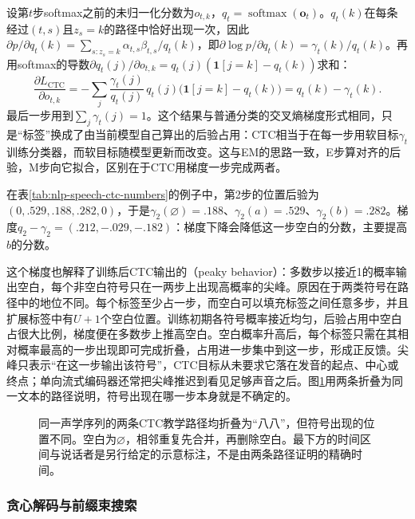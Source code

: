 设第$t$步softmax之前的未归一化分数为$o_{t,k}$，$q_t=\operatorname{softmax}(\bm{o}_t)$。$q_t(k)$在每条经过$(t,s)$且$z_s=k$的路径中恰好出现一次，因此$\partial p/\partial q_t(k)=\sum_{s:z_s=k}\alpha_{t,s}\beta_{t,s}/q_t(k)$，即$\partial\log p/\partial q_t(k)=\gamma_t(k)/q_t(k)$。再用softmax的导数$\partial q_t(j)/\partial o_{t,k}=q_t(j)(\mathbf{1}[j=k]-q_t(k))$求和：
\begin{equation}
 \frac{\partial L_{\mathrm{CTC}}}{\partial o_{t,k}}
 =-\sum_j\frac{\gamma_t(j)}{q_t(j)}\,q_t(j)\bigl(\mathbf{1}[j=k]-q_t(k)\bigr)
 =q_t(k)-\gamma_t(k).
 \label{eq:nlp-speech-ctc-gradient}
\end{equation}
最后一步用到$\sum_j\gamma_t(j)=1$。这个结果与普通分类的交叉熵梯度形式相同，只是“标签”换成了由当前模型自己算出的后验占用：CTC相当于在每一步用软目标$\gamma_t$训练分类器，而软目标随模型更新而改变。这与EM的思路一致，E步算对齐的后验，M步向它拟合，区别在于CTC用梯度一步完成两者。

在表\ref{tab:nlp-speech-ctc-numbers}的例子中，第2步的位置后验为$(0,.529,.188,.282,0)$，于是$\gamma_2(\varnothing)=.188$、$\gamma_2(a)=.529$、$\gamma_2(b)=.282$。梯度$q_2-\gamma_2=(.212,-.029,-.182)$：梯度下降会降低这一步空白的分数，主要提高$b$的分数。

这个梯度也解释了训练后CTC输出的（peaky behavior）：多数步以接近1的概率输出空白，每个非空白符号只在一两步上出现高概率的尖峰。原因在于两类符号在路径中的地位不同。每个标签至少占一步，而空白可以填充标签之间任意多步，并且扩展标签中有$U+1$个空白位置。训练初期各符号概率接近均匀，后验占用中空白占很大比例，梯度便在多数步上推高空白。空白概率升高后，每个标签只需在其相对概率最高的一步出现即可完成折叠，占用进一步集中到这一步，形成正反馈。尖峰只表示“在这一步输出该符号”，CTC目标从未要求它落在发音的起点、中心或终点；单向流式编码器还常把尖峰推迟到看见足够声音之后。图\ref{fig:nlp-speech-alignment}用两条折叠为同一文本的路径说明，符号出现在哪一步本身就是不确定的。

\begin{figure}[htbp]
  \centering
  
  \caption{同一声学序列的两条CTC教学路径均折叠为“八八”，但符号出现的位置不同。空白为$\varnothing$，相邻重复先合并，再删除空白。最下方的时间区间与说话者是另行给定的示意标注，不是由两条路径证明的精确时间。}
  \label{fig:nlp-speech-alignment}
\end{figure}
\FloatBarrier

\subsubsection{贪心解码与前缀束搜索}
\label{sec:nlp-speech-ctc-decoding}

